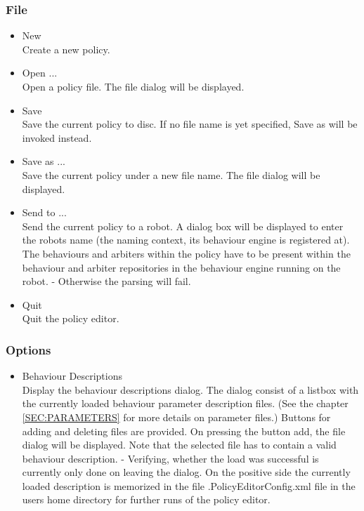 \subsubsection{File}
\begin{itemize}
\item New \\
  Create a new policy.
\item Open ... \\
  Open a policy file. The file dialog will be displayed.
\item Save \\
  Save the current policy to disc. If no file name is yet specified,
  Save as will be invoked instead.
\item Save as ... \\
  Save the current policy under a new file name. The file dialog will be
  displayed.
\item Send to ... \\
  Send the current policy to a robot. A dialog box will be displayed to
  enter the robots name (the naming context, its behaviour engine is
  registered at). The behaviours and arbiters within the policy have to
  be present within the behaviour and arbiter repositories in the
  behaviour engine running on the robot. - Otherwise the parsing will
  fail.
\item Quit \\
  Quit the policy editor.
\end{itemize}
\subsubsection{Options}
\begin{itemize}
\item Behaviour Descriptions \\
  Display the behaviour descriptions dialog. The dialog consist of a
  listbox with the currently loaded behaviour parameter description
  files. (See the chapter \ref{SEC:PARAMETERS} for more details on
  parameter files.) Buttons for adding and deleting files are
  provided. On pressing the button add, the file dialog will be
  displayed. Note that the selected file has to contain a valid
  behaviour description. - Verifying, whether the load was successful
  is currently only done on leaving the dialog. On the positive side
  the currently loaded description is memorized in the file
  .PolicyEditorConfig.xml file in the users home directory for further
  runs of the policy editor.
\end{itemize}
